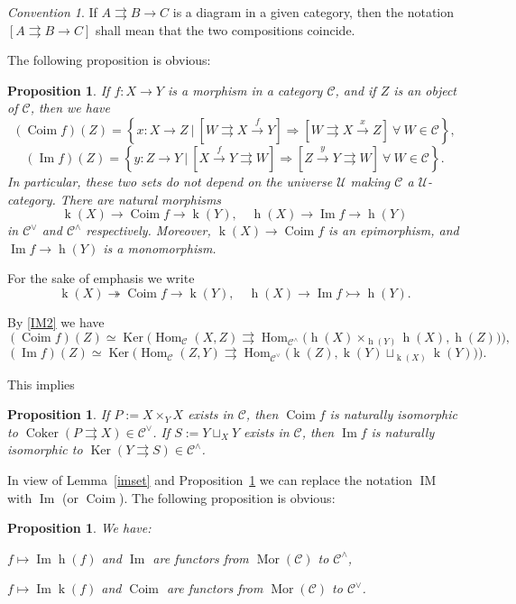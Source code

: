 \documentclass[12pt]{article}%
\newtheorem{prop}[thm]{Proposition}
\theoremstyle{remark}
\newtheorem{conv}[thm]{Convention}
\theoremstyle{definition}
\newcommand{\C}{\mathcal C}
\newcommand{\U}{\mathcal U}
\newcommand{\epi}{\twoheadrightarrow}
\newcommand{\mono}{\rightarrowtail}%
\newcommand{\parar}{\rightrightarrows}
\newcommand{\then}{\Rightarrow}
\newcommand{\xr}{\xrightarrow}
\DeclareMathOperator{\Coim}{Coim}
\DeclareMathOperator{\Coker}{Coker}
\DeclareMathOperator{\Ima}{Im}
\DeclareMathOperator{\IM}{IM}
\DeclareMathOperator{\hy}{h}
\DeclareMathOperator{\ky}{k}
\DeclareMathOperator{\Hom}{Hom}%
\DeclareMathOperator{\Ker}{Ker}
\DeclareMathOperator{\Mor}{Mor}
\begin{document}
\begin{conv}\label{bra}
If $A\parar B\to C$ is a diagram in a given category, then the notation $[A\parar B\to C]$ shall mean that the two compositions coincide.
\end{conv}

The following proposition is obvious:

\begin{prop}\label{epimono}
If $f:X\to Y$ is a morphism in a category $\C$, and if $Z$ is an object of $\C$, then we have 
$$
(\Coim f)(Z)=\left\{x:X\to Z\ \bigg|\ \left[W\parar X\xr fY\right]\then\left[W\parar X\xr xZ\right]\ \forall\ W\in\C\right\},
$$
$$
(\Ima f)(Z)=\left\{y:Z\to Y\ \bigg|\ \left[X\xr fY\parar W\right]\then\left[Z\xr yY\parar W\right]\ \forall\ W\in\C\right\}.
$$ 
In particular, these two sets do not depend on the universe $\U$ making $\C$ a $\U$-category. There are natural morphisms 
$$
\ky(X)\to\Coim f\to\ky(Y),\quad\hy(X)\to\Ima f\to\hy(Y)
$$ 
in $\C^\vee$ and $\C^\wedge$ respectively. Moreover, $\ky(X)\to\Coim f$ is an epimorphism, and $\Ima f\to\hy(Y)$ is a monomorphism. 
\end{prop} 

For the sake of emphasis we write
$$
\ky(X)\epi\Coim f\to\ky(Y),\quad\hy(X)\to\Ima f\mono\hy(Y).
$$ 

By \eqref{IM2} we have 
$$ 
(\Coim f)(Z)\simeq\Ker\Big(\Hom_\C(X,Z)\parar\Hom_{\C^\wedge}\big(\hy(X)\times_{\hy(Y)}\hy(X),\hy(Z)\big)\Big), 
$$ 
$$ 
(\Ima f)(Z)\simeq\Ker\Big(\Hom_\C(Z,Y)\parar\Hom_{\C^\vee}\big(\ky(Z),\ky(Y)\sqcup_{\ky(X)}\ky(Y)\big)\Big). 
$$
 
This implies 

\begin{prop}\label{coimim}
If $P:=X\times_YX$ exists in $\C$, then $\Coim f$ is naturally isomorphic to $\Coker(P\parar X)\in\C^\vee$. If $S:=Y\sqcup_XY$ exists in $\C$, then $\Ima f$ is naturally isomorphic to $\Ker(Y\parar S)\in\C^\wedge$. 
\end{prop} 

In view of Lemma~\ref{imset} and Proposition~\ref{coimim} we can replace the notation $\IM$ with $\Ima$ (or $\Coim$). The following proposition is obvious: 

\begin{prop}\label{fun}
We have: 

$f\mapsto\Ima\hy(f)$ and $\Ima$ are functors from $\Mor(\C)$ to $\C^\wedge$, 

$f\mapsto\Ima\ky(f)$ and $\Coim$ are functors from $\Mor(\C)$ to $\C^\vee$. 
\end{prop}
\end{document}
